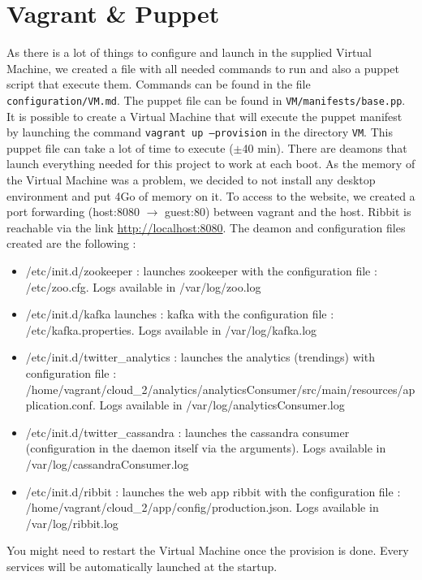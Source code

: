 \documentclass[conference,9pt]{IEEEtran}
\begin{document}
\section{Vagrant \& Puppet}
As there is a lot of things to configure and launch in the supplied Virtual Machine, we created a file with all needed commands to run and also a puppet script that execute them. Commands can be found in the file \texttt{configuration/VM.md}. The puppet file can be found in \texttt{VM/manifests/base.pp}. It is possible to create a Virtual Machine that will execute the puppet manifest by launching the command \texttt{vagrant up --provision} in the directory \texttt{VM}. This puppet file can take a lot of time to execute ($\pm{}$40 min). There are deamons that launch everything needed for this project to work at each boot. As the memory of the Virtual Machine was a problem, we decided to not install any desktop environment and put 4Go of memory on it. To access to the website, we created a port forwarding (host:8080 $\rightarrow{}$ guest:80) between vagrant and the host. Ribbit is reachable via the link \url{http://localhost:8080}. The deamon and configuration files created are the following :
\begin{itemize}
\item /etc/init.d/zookeeper : launches zookeeper with the configuration file : /etc/zoo.cfg. Logs available in /var/log/zoo.log
\item /etc/init.d/kafka launches : kafka with the configuration file : /etc/kafka.properties. Logs available in /var/log/kafka.log
\item /etc/init.d/twitter\_analytics : launches the analytics (trendings) with configuration file : /home/vagrant/cloud\_2/analytics/analyticsConsumer/src/main/resources/application.conf. Logs available in /var/log/analyticsConsumer.log
\item /etc/init.d/twitter\_cassandra : launches the cassandra consumer (configuration in the daemon itself via the arguments). Logs available in /var/log/cassandraConsumer.log
\item /etc/init.d/ribbit : launches the web app ribbit with the configuration file : /home/vagrant/cloud\_2/app/config/production.json. Logs available in /var/log/ribbit.log
\end{itemize}
You might need to restart the Virtual Machine once the provision is done. Every services will be automatically launched at the startup.
\end{document}
